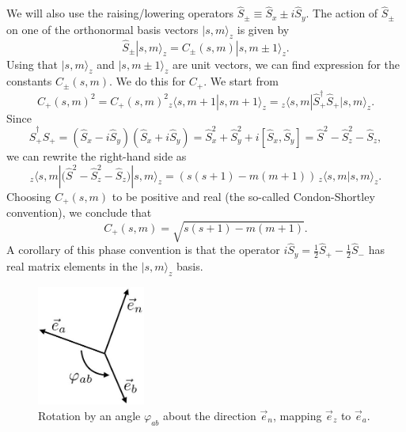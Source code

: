 We will also use the raising/lowering operators $\hat{S}_{\pm} \equiv \hat{S}_x\pm i \hat{S}_y$. The action of $\hat{S}_{\pm}$ on one of the orthonormal basis vectors $|s,m\rangle_z$ is given by
\begin{equation}
\hat{S}_\pm |s,m\rangle_z = C_\pm(s,m)|s,m \pm1\rangle_z.
\label{raising operator}
\end{equation}
Using that $|s,m\rangle_z$ and $|s,m\pm1\rangle_z$ are unit vectors, we can find expression for the constants $C_\pm(s,m)$. We do this for $C_+$. We start from
\begin{equation}
C_+(s,m)^2 = C_+(s,m)^2 {_z}\langle s,m+1|s,m+1\rangle_z = {_z\!}\langle s,m|\hat{S}_+^\dagger \hat{S}_+|s,m\rangle_{\!z}.
\label{raising norm 1}
\end{equation}
Since
\begin{equation}
\hat{S}_+^\dagger \hat{S}_+ = (\hat{S}_x-i \hat{S}_y)(\hat{S}_x+i \hat{S}_y) = \hat{S}_x^2+\hat{S}_y^2 +i[\hat{S}_x,\hat{S}_y]=\hat{S}^2 - \hat{S}_z^2-\hat{S}_z,
\label{raising}
\end{equation}
we can rewrite the right-hand side as
\begin{equation}
{_z\!}\langle s,m|\big(\hat{S}^2-\hat{S}_z^2-\hat{S}_z\big)|s,m\rangle_{\!z} = (s(s+1)-m(m+1)) \, {_z\!}\langle s,m|s,m\rangle_{\!z}.
\label{raising norm 2}
\end{equation}
Choosing $C_+(s,m)$ to be positive and real (the so-called Condon-Shortley convention), we conclude that
\begin{equation}
C_+(s,m)=\sqrt{s(s+1)-m(m+1)}.
\label{coef raising}
\end{equation}
A corollary of this phase convention is that the operator $i\hat{S}_y = \frac12 \hat{S}_{+}-\frac12 \hat{S}_-$ has real matrix elements in the $|s,m\rangle_{\!z}$ basis.

\begin{figure}[ht]
 \centering
   \includegraphics[width=1.4in]{rotation.jpeg} 
   \caption{Rotation by an angle $\varphi_{ab}$ about the direction $\vec{e}_n$, mapping $\vec{e}_z$ to $\vec{e}_a$.}
   \label{rotation}
\end{figure}


